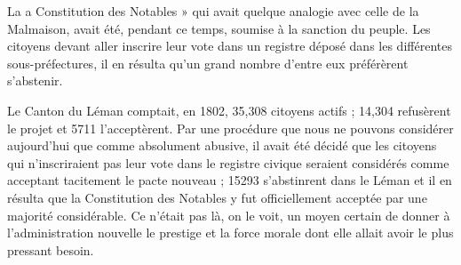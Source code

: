 \documentclass[french,twoside]{book} %
\begin{document}
\noindent La a Constitution des Notables » qui avait quelque analogie avec celle de la Malmaison, avait été, pendant ce temps, soumise à la sanction du peuple. Les citoyens devant aller inscrire leur vote dans un registre déposé dans les différentes sous-préfectures, il en résulta qu’un grand nombre d’entre eux préférèrent s’abstenir.\par
Le Canton du Léman comptait, en 1802, 35,308 citoyens actifs ; 14,304 refusèrent le projet et 5711 l’acceptèrent. Par une procédure que nous ne pouvons considérer aujourd’hui que comme absolument abusive, il avait été décidé que les citoyens qui n’inscriraient pas leur vote dans le registre civique seraient considérés comme acceptant tacitement le pacte nouveau ; 15293 s’abstinrent dans le Léman et il en résulta que la Constitution des Notables y fut officiellement acceptée par une majorité considérable. Ce n’était pas là, on le voit, un moyen certain de donner à l’administration nouvelle le prestige et la force morale dont elle allait avoir le plus pressant besoin.
\end{document}
